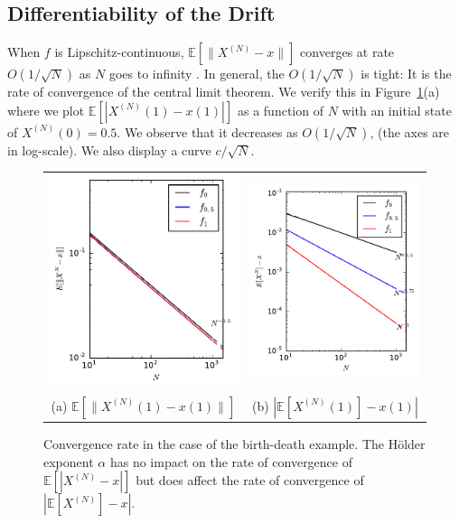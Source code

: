 \documentclass[sigconf]{acmart}
\newcommand\XN{X^{(N)}}
\newcommand\sesp[1]{\mathbb{E}[#1]}
\newcommand\snorm[1]{\|#1\|}
\begin{document}
\subsection{Differentiability of the Drift}
\label{sec:BD}

When $f$ is Lipschitz-continuous, $\sesp{\snorm{\XN-x}}$ converges at
rate $O(1/\sqrt{N})$ as $N$ goes to infinity
\cite{benaim2008class,kurtz70}. In general, the $O(1/\sqrt{N})$ is
tight: It is the rate of convergence of the central limit theorem. We
verify this in Figure~\ref{fig:rate_fL-f2}(a) where we plot
$\sesp{|\XN(1)-x(1)|}$ as a function of $N$ with an initial state of
$\XN(0)=0.5$. We observe that it decreases as $O(1/\sqrt{N})$, (the
axes are in log-scale). We also display a curve $c/\sqrt{N}$.

\begin{figure}[ht]
  \centering
  \begin{tabular}{@{}c@{}c@{}}
    \includegraphics[width=.5\linewidth]{rate_birthRate_norm2}
    &\includegraphics[width=.5\linewidth]{rate_birthRate}\\
    (a) $\sesp{\snorm{\XN(1)-x(1)}}$ & (b) $|\sesp{\XN(1)}-x(1)|$
  \end{tabular}
  \caption{Convergence rate in the case of the birth-death
    example. The Hölder exponent $\alpha$ has no impact on the rate of
    convergence of $\sesp{|\XN-x|}$ but does affect the rate of
    convergence of $|\sesp{\XN}-x|$.}
  \label{fig:rate_fL-f2}
\end{figure}
\end{document}

